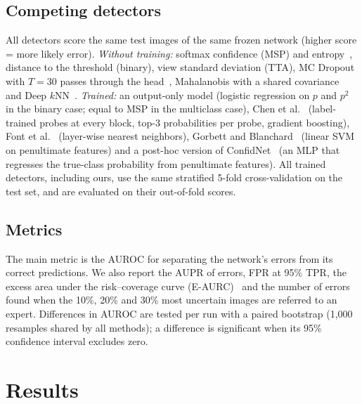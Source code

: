 \documentclass[conference,a4paper]{IEEEtran}
\begin{document}
\subsection{Competing detectors}
All detectors score the same test images of the same frozen network (higher score = more likely error).
\emph{Without training:} softmax confidence (MSP) and entropy~\cite{hendrycks2017}, distance to the threshold (binary), view standard
deviation (TTA), MC Dropout with $T=30$ passes through the head~\cite{gal2016}, Mahalanobis with a shared covariance~\cite{lee2018}
and Deep $k$NN~\cite{papernot2018}.
\emph{Trained:} an output-only model (logistic regression on $p$ and $p^2$ in the binary case; equal to MSP in the multiclass case),
Chen et al.~\cite{chen2019} (label-trained probes at every block, top-3 probabilities per probe, gradient boosting),
Font et al.~\cite{font2025} (layer-wise nearest neighbors), Gorbett and Blanchard~\cite{gorbett2022} (linear SVM on penultimate features)
and a post-hoc version of ConfidNet~\cite{corbiere2019} (an MLP that regresses the true-class probability from penultimate features).
All trained detectors, including ours, use the same stratified 5-fold cross-validation on the test set, and are evaluated on their
out-of-fold scores.

\subsection{Metrics}
The main metric is the AUROC for separating the network's errors from its correct predictions. We also report the AUPR of errors,
FPR at 95\% TPR, the excess area under the risk--coverage curve (E-AURC)~\cite{jaeger2023} and the number of errors found when the
10\%, 20\% and 30\% most uncertain images are referred to an expert. Differences in AUROC are tested per run with a paired bootstrap
(1,000 resamples shared by all methods); a difference is significant when its 95\% confidence interval excludes zero.

\section{Results}


\end{document}
